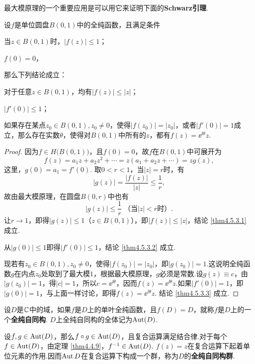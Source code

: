 最大模原理的一个重要应用是可以用它来证明下面的\textbf{Schwarz引理}.
\begin{theorem}\label{thm4.5.3}
  设$f$是单位圆盘$B(0,1)$中的全纯函数，且满足条件
  \begin{eenum}
    \item 当$z\in B(0,1)$时，$|f(z)|\le1$；
    \item $f(0)=0$，
  \end{eenum}
  那么下列结论成立：
  \begin{eenum}
    \item \label{thm4.5.3.1} 对于任意$z\in B(0,1)$，均有$|f(z)|\le |z|$；
    \item \label{thm4.5.3.2} $|f'(0)|\le1$；
    \item \label{thm4.5.3.3} 如果存在某点$z_0\in B(0,1),z_0\ne0$，使得$|f(z_0)|=|z_0|$，或者$|f'(0)|=1$成立，那么存在实数$\theta$，使得对$B(0,1)$中所有的$z$，都有$f(z)=\ee^{\ii\theta}z$.
  \end{eenum}
\end{theorem}
\begin{proof}
  因为$f\in H\big(B(0,1)\big)$，且$f(0)=0$，故$f$在$B(0,1)$中可展开为
  \[
    f(z)=a_1z+a_2z^2+\cdots=z(a_1+a_2z+\cdots)=zg(z),
  \]
  这里，$g(0)=a_1=f'(0)$. 取$0<r<1$，当$|z|=r$时，有
  \[
    |g(z)| = \frac{|f(z)|}{|z|} \le \frac1r,
  \]
  故由最大模原理，在圆盘$B(0,r)$中也有
  \[
    |g(z)| \le \frac1r\;\mbox{（当$|z|<r$时）}.
  \]
  让$r\to1$，即得$|g(z)|\le1$（$z\in B(0,1)$），即$|f(z)|\le|z|$，结论 \ref{thm4.5.3.1} 成立.

  从$|g(0)|\le1$即得$|f'(0)|\le1$，结论 \ref{thm4.5.3.2} 成立.

  现若有$z_0\in B(0,1),z_0\ne0$，使得$|f(z_0)|=|z_0|$，即$|g(z_0)|=1$.这说明全纯函数$g$在内点$z_0$处取到了最大模$1$，根据最大模原理，$g$必须是常数.设$g(z)\equiv c$，由$|g(z_0)|=1$，得$|c|=1$，所以$c=\ee^{\ii\theta}$，因而$f(z)=\ee^ {\ii\theta}z$.如果$|f'(0)|=1$，即$|g(0)|=1$，与上面一样讨论，即得$f(z)=\ee^ {\ii\theta}z$. 结论 \ref{thm4.5.3.3} 成立.
\end{proof}

\begin{definition}\label{def4.5.4}
  设$D$是$\mathbb C$中的域，如果$f$是$D$上的单叶全纯函数，且$f(D)=D$，就称$f$是$D$上的一个\textbf{全纯自同构}. $D$上全纯自同构的全体记为$\operatorname{Aut}(D)$.
\end{definition}

设$f,g\in \operatorname{Aut}(D)$，那么$f\circ g\in \operatorname{Aut}(D)$，且复合运算满足结合律.对于每个$f\in\operatorname{Aut}(D)$，由定理 \ref{thm4.4.9}，$f^{-1}\in\operatorname{Aut}(D)$. $f(z)=z$在复合运算下起着单位元素的作用.因而$\operatorname{Aut} D$在复合运算下构成一个群，称为$D$的\textbf{全纯自同构群}.

